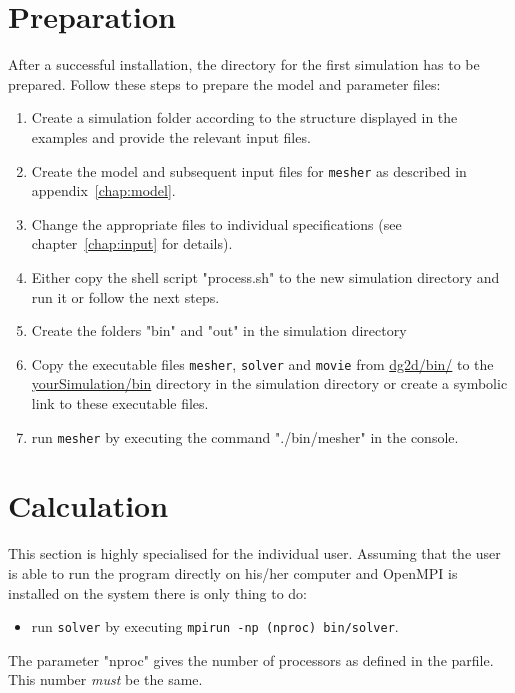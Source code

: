 	\section{Preparation}
	\label{sec:prep}
		After a successful installation, the directory for the first simulation has to be prepared. Follow these steps to prepare the model and parameter files:
		\begin{enumerate}
			\item Create a simulation folder according to the structure displayed in the examples and provide the relevant input files.
			\item Create the model and subsequent input files for \texttt{mesher} as described in appendix~\ref{chap:model}.
			\item Change the appropriate files to individual specifications (see chapter~\ref{chap:input} for details).
			\item Either copy the shell script "process.sh" to the new simulation directory and run it or follow the next steps.
			\item Create the folders "bin" and "out" in the simulation directory
			\item Copy the executable files \texttt{mesher}, \texttt{solver} and \texttt{movie} from \url{dg2d/bin/} to the \url{yourSimulation/bin} directory in the simulation directory or create a symbolic link to these executable files.
			\item run \texttt{mesher} by executing the command "./bin/mesher" in the console.
		\end{enumerate}
		
	\section{Calculation}
	\label{sec:calc}
		This section is highly specialised for the individual user. Assuming that the user is able to run the program directly on his/her computer and OpenMPI is installed on the system there is only thing to do: 
		\begin{itemize}
			\item run \texttt{solver} by executing \texttt{mpirun -np (nproc) bin/solver}.
		\end{itemize}
		The parameter "nproc" gives the number of processors as defined in the parfile. This number \textit{must} be the same.
		
